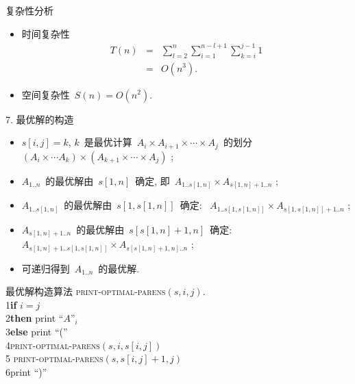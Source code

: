 \documentclass[fontset=fandol,UTF8,fleqn]{beamer}
\begin{document}
\begin{frame}{复杂性分析}
  \begin{itemize}[<+-|alert@+>]
\item 时间复杂性~
  \begin{eqnarray*}
    T(n) & = & \sum_{l=2}^{n}\sum_{i=1}^{n-l+1}\sum_{k=i}^{j-1}1   \\
         & = & O(n^3). 
  \end{eqnarray*}
\item 空间复杂性~$S(n)=O(n^2)$. 
\end{itemize}
\end{frame}

\begin{frame}{7. 最优解的构造}
  \begin{itemize}[<+-|alert@+>]
\item $s[i,j]=k$, $k$~是最优计算~$A_i\times A_{i+1}\times \cdots \times A_j$~的划分~$(A_i\times \cdots A_k)\times (A_{k+1}\times \cdots \times A_j)$ ;
\item $A_{1..n}$~的最优解由~$s[1,n]$~确定, 即~$A_{1..s[1,n]}\times A_{s[1,n]+1..n}$ ;
\item $A_{1..s[1,n]}$~的最优解由~$s[1, s[1,n]]$~确定: \hspace*{3cm} ~$A_{1..s[1,s[1,n]]}\times A_{s[1,s[1,n]]+1..n}$ ;
\item $A_{s[1,n]+1..n}$~的最优解由~$s[s[1,n]+1,n]$~确定: \hspace*{3cm} ~$A_{s[1,n]+1..s[1,s[1,n]]}\times A_{s[s[1,n]+1,n]..n}$ ;
\item 可递归得到~$A_{1..n}$~的最优解.  
\end{itemize}
\end{frame}

\begin{frame}{最优解构造算法}
\textsc{print-optimal-parens}$(s, i, j)$.\\
1\qquad  \textbf{if} $i=j$\\
2\qquad \textbf{then} print ``$A$''$_i$\\
3\qquad \textbf{else} print ``(''\\
4\qquad \qquad \textsc{print-optimal-parens}$(s,i,s[i,j])$\\
5\qquad \qquad
\textsc{print-optimal-parens}$(s,s[i,j]+1,j)$\\
6\qquad\qquad print ``)''
\end{frame}
\end{document}
